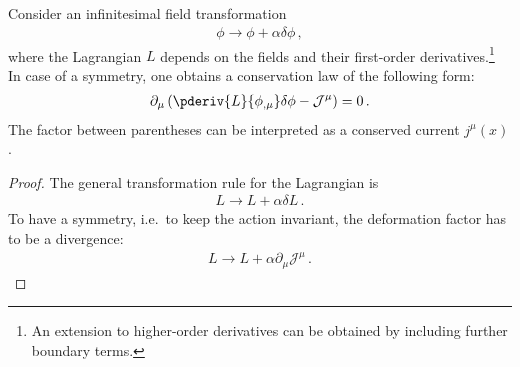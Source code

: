     \begin{theorem}\label{field:noethers_theorem}
        Consider an infinitesimal field transformation
        \begin{gather}
            \phi\longrightarrow\phi+\alpha\delta\phi\,,
        \end{gather}
        where the Lagrangian $L$ depends on the fields and their first-order derivatives.\footnote{An extension to higher-order derivatives can be obtained by including further boundary terms.} In case of a symmetry, one obtains a conservation law of the following form:
        \begin{gather}
            \label{field:conserved_current}
            \partial_\mu\left(\pderiv{L}{\phi_{,\mu}}\delta\phi - \mathcal{J}^\mu\right) = 0\,.
        \end{gather}
        The factor between parentheses can be interpreted as a conserved current $j^\mu(x)$.
        \begin{mdframed}[roundcorner=10pt, linecolor=blue, linewidth=1pt]
            \begin{proof}
                The general transformation rule for the Lagrangian is
                \begin{gather}
                    \label{noether_deriv:1}
                    L\longrightarrow L + \alpha\delta L\,.
                \end{gather}
                To have a symmetry, i.e.~to keep the action invariant, the deformation factor has to be a divergence:
                \begin{gather}
                    \label{noether_deriv:2}
                    L\longrightarrow L + \alpha\partial_\mu\mathcal{J}^\mu\,.
                \end{gather}


\end{proof}
\end{mdframed}
\end{theorem}

